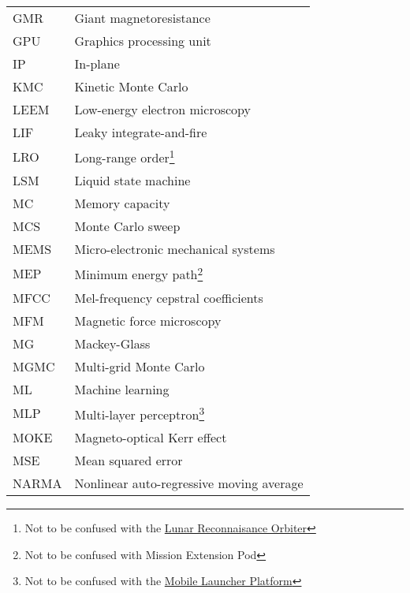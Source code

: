 {\begin{longtable}[l]{ll}
        GMR   & Giant magnetoresistance                     \\
        GPU   & Graphics processing unit                    \\
        IP    & In-plane                                    \\
        KMC   & Kinetic Monte Carlo                         \\
        LEEM  & Low-energy electron microscopy              \\
        LIF   & Leaky integrate-and-fire                    \\
        LRO   & Long-range order\footnote{Not to be confused with the \href{https://en.wikipedia.org/wiki/Lunar_Reconnaissance_Orbiter}{Lunar Reconnaisance Orbiter}} \\
        LSM   & Liquid state machine                        \\
        MC    & Memory capacity                             \\ %
        MCS   & Monte Carlo sweep                           \\
        MEMS  & Micro-electronic mechanical systems         \\
        MEP   & Minimum energy path\footnote{Not to be confused with Mission Extension Pod} \\
        MFCC  & Mel-frequency cepstral coefficients         \\
        MFM   & Magnetic force microscopy                   \\
        MG    & Mackey-Glass                                \\
        MGMC  & Multi-grid Monte Carlo                      \\
        ML    & Machine learning                            \\
        MLP   & Multi-layer perceptron\footnote{Not to be confused with the \href{https://en.wikipedia.org/wiki/Mobile_launcher_platform}{Mobile Launcher Platform}} \\ %
        MOKE  & Magneto-optical Kerr effect                 \\
        MSE   & Mean squared error                          \\
        NARMA & Nonlinear auto-regressive moving average    \\

\end{longtable}}
